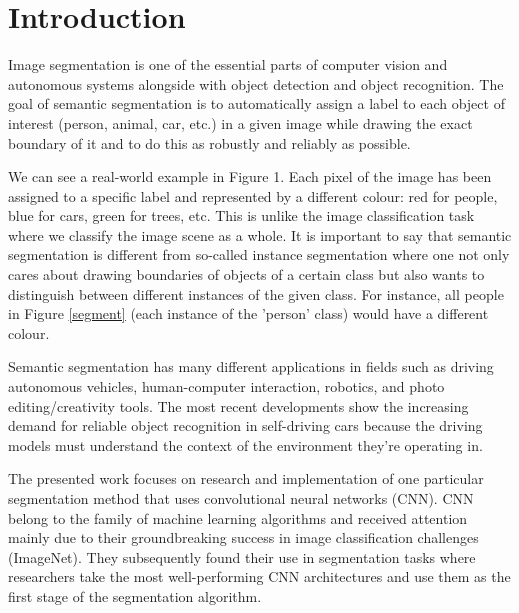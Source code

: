 \chapter{Introduction}
Image segmentation is one of the essential parts of computer vision and autonomous systems alongside with object detection and object recognition. The goal of semantic segmentation is to automatically assign a label to each object of interest (person, animal, car, etc.) in a given image while drawing the exact boundary of it and to do this as robustly and reliably as possible. 

We can see a real-world example in Figure 1. Each pixel of the image has been assigned to a specific label and represented by a different colour: red for people, blue for cars, green for trees, etc. This is unlike the image classification task where we classify the image scene as a whole. It is important to say that semantic segmentation is different from so-called instance segmentation where one not only cares about drawing boundaries of objects of a certain class but also wants to distinguish between different instances of the given class. For instance, all people in Figure \ref{segment} (each instance of the 'person' class) would have a different colour.

Semantic segmentation has many different applications in fields such as driving autonomous vehicles, human-computer interaction, robotics, and photo editing/creativity tools. The most recent developments show the increasing demand for reliable object recognition in self-driving cars because the driving models must understand the context of the environment they’re operating in. \cite{mwiti}

The presented work focuses on research and implementation of one particular segmentation method that uses convolutional neural networks (CNN). CNN belong to the family of machine learning algorithms and received attention mainly due to their groundbreaking success in image classification challenges (ImageNet). They subsequently found their use in segmentation tasks where researchers take the most well-performing CNN architectures and use them as the first stage of the segmentation algorithm.

